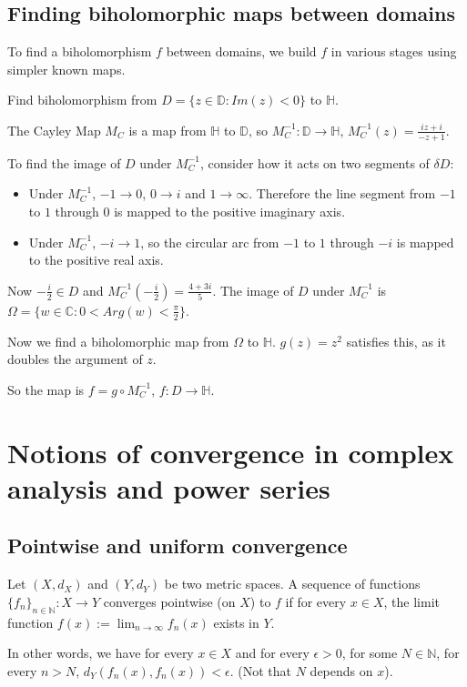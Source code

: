 \subsection{Finding biholomorphic maps between domains}

To find a biholomorphism $f$ between domains, we build $f$ in various stages using simpler known maps.

\begin{example}
	Find biholomorphism from $D = \{z \in \mathbb{D}: Im(z) < 0\}$ to $\mathbb{H}$.

	The Cayley Map $M_C$ is a map from $\mathbb{H}$ to $\mathbb{D}$, so $M_C^{-1}: \mathbb{D} \rightarrow \mathbb{H}$, $M_C^{-1}(z) = \frac{iz + i}{-z + 1}$.

	To find the image of $D$ under $M_C^{-1}$, consider how it acts on two segments of $\delta D$:

	\begin{itemize}
		\item Under $M_C^{-1}$, $-1 \rightarrow 0$, $0 \rightarrow i$ and $1 \rightarrow \infty$. Therefore the line segment from $-1$ to $1$ through $0$ is mapped to the positive imaginary axis.
		\item Under $M_C^{-1}$, $-i \rightarrow 1$, so the circular arc from $-1$ to $1$ through $-i$ is mapped to the positive real axis.
	\end{itemize}

	Now $-\frac{i}{2} \in D$ and $M_C^{-1}(-\frac{i}{2}) = \frac{4 + 3i}{5}$. The image of $D$ under $M_C^{-1}$ is $\Omega = \{w \in \mathbb{C}: 0 < Arg(w) < \frac{\pi}{2}\}$.

	Now we find a biholomorphic map from $\Omega$ to $\mathbb{H}$. $g(z) = z^2$ satisfies this, as it doubles the argument of $z$.

	So the map is $f = g \circ M_C^{-1}$, $f: D \rightarrow \mathbb{H}$.
\end{example}

\section{Notions of convergence in complex analysis and power series}

\subsection{Pointwise and uniform convergence}

\begin{definition}
	Let $(X, d_X)$ and $(Y, d_Y)$ be two metric spaces. A sequence of functions ${\{f_n\}}_{n \in \mathbb{N}}: X \rightarrow Y$ converges pointwise (on $X$) to $f$ if for every $x \in X$, the limit function $f(x) := \lim_{n \rightarrow \infty} f_n(x)$ exists in $Y$.

	In other words, we have for every $x \in X$ and for every $\epsilon > 0$, for some $N \in \mathbb{N}$, for every $n > N$, $d_Y(f_n(x), f_n(x)) < \epsilon$. (Not that $N$ depends on $x$).
\end{definition}

